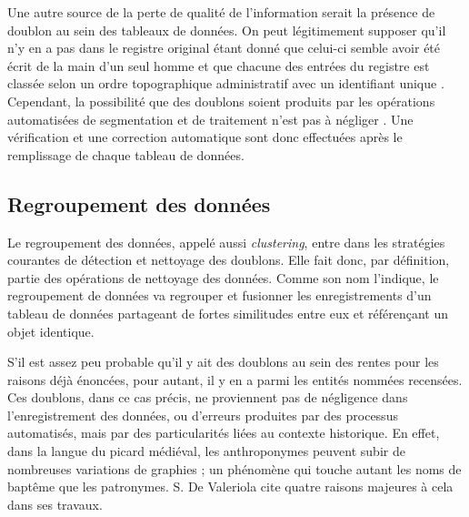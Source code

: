 Une autre source de la perte de qualité de l'information serait la présence de doublon au sein des tableaux de données. On peut légitimement supposer qu'il n'y en a pas dans le registre original étant donné que celui-ci semble avoir été écrit de la main d'un seul homme  et que chacune des entrées du registre est classée selon un ordre topographique administratif avec un identifiant unique \parencite{espinas_les_1933}. Cependant, la possibilité que des doublons soient produits par les opérations automatisées de segmentation et de traitement n’est pas à négliger \parencite{koudoro-parfait_reconnaissance_2022}. Une vérification et une correction automatique sont donc effectuées après le remplissage de chaque tableau de données.

\subsection{Regroupement des données}
Le regroupement des données, appelé aussi \textit{clustering}, entre dans les stratégies courantes de détection et nettoyage des doublons. Elle fait donc, par définition, partie des opérations de nettoyage des données. Comme son nom l'indique, le regroupement de données va regrouper et fusionner les enregistrements d'un tableau de données  partageant de fortes similitudes entre eux et référençant un objet identique. 

S'il est assez peu probable qu'il y ait des doublons au sein des rentes pour les raisons déjà énoncées, pour autant, il y en a parmi les entités nommées recensées. Ces doublons, dans ce cas précis, ne proviennent pas de négligence dans l'enregistrement des données, ou d'erreurs  produites par des processus automatisés, mais par des particularités liées au contexte historique.
En effet, dans la langue du picard médiéval, les anthroponymes peuvent subir de nombreuses variations de graphies ; un phénomène qui touche autant les noms de baptême que les patronymes. S. De Valeriola cite quatre raisons majeures à cela dans ses travaux.

